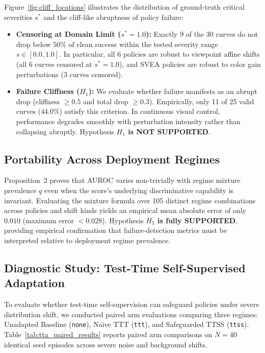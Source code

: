 Figure~\ref{fig:cliff_locations} illustrates the distribution of ground-truth critical severities $s^*$ and the cliff-like abruptness of policy failure:
\begin{itemize}
    \item \textbf{Censoring at Domain Limit ($s^* = 1.0$):} Exactly 9 of the 30 curves do not drop below $50\%$ of clean success within the tested severity range $s \in [0.0, 1.0]$. In particular, all 6 policies are robust to viewpoint affine shifts (all 6 curves censored at $s^* = 1.0$), and SVEA policies are robust to color gain perturbations (3 curves censored).
    \item \textbf{Failure Cliffness ($H_1$):} We evaluate whether failure manifests as an abrupt drop (cliffness $\ge 0.5$ and total drop $\ge 0.3$). Empirically, only 11 of 25 valid curves ($44.0\%$) satisfy this criterion. In continuous visual control, performance degrades smoothly with perturbation intensity rather than collapsing abruptly. Hypothesis \textbf{$H_1$ is NOT SUPPORTED}.
\end{itemize}

\subsection{Portability Across Deployment Regimes}
\label{sec:results:portability}

Proposition~2 proves that AUROC varies non-trivially with regime mixture prevalence $q$ even when the score's underlying discriminative capability is invariant.
Evaluating the mixture formula over 105 distinct regime combinations across policies and shift kinds yields an empirical mean absolute error of only \textbf{$0.010$} (maximum error $< 0.028$).
Hypothesis \textbf{$H_5$ is fully SUPPORTED}, providing empirical confirmation that failure-detection metrics must be interpreted relative to deployment regime prevalence.

\subsection{Diagnostic Study: Test-Time Self-Supervised Adaptation}
\label{sec:results:ttss}

To evaluate whether test-time self-supervision can safeguard policies under severe distribution shift, we conducted paired arm evaluations comparing three regimes: Unadapted Baseline (\texttt{none}), Naive TTT (\texttt{ttt}), and Safeguarded TTSS (\texttt{ttss}).
Table~\ref{tab:tta_paired_results} reports paired arm comparisons on $N = 40$ identical seed episodes across severe noise and background shifts.

